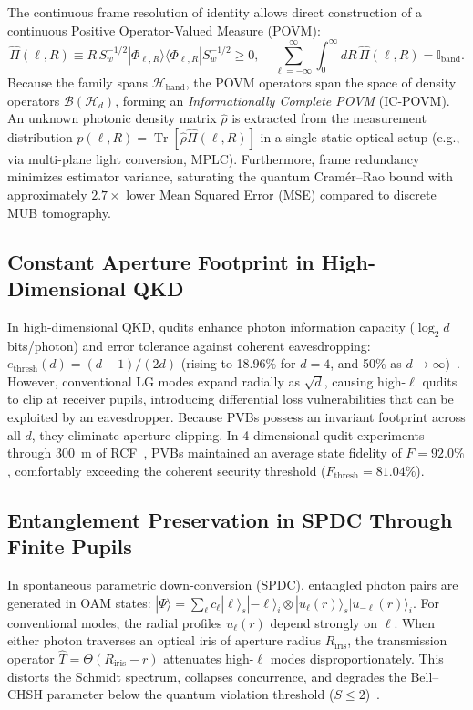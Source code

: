 \documentclass[11pt,a4paper]{article}
\begin{document}
The continuous frame resolution of identity allows direct construction of a continuous Positive Operator-Valued Measure (POVM):
\begin{equation}
\boxed{\hat{\Pi}(\ell, R) \equiv R \, S_w^{-1/2} |\Phi_{\ell, R}\rangle \langle \Phi_{\ell, R}| S_w^{-1/2} \ge 0, \quad \sum_{\ell=-\infty}^\infty \int_0^\infty dR \, \hat{\Pi}(\ell, R) = \mathbb{I}_{\text{band}}.}
\label{eq:povm_def}
\end{equation}
Because the family spans $\mathcal{H}_{\text{band}}$, the POVM operators span the space of density operators $\mathcal{B}(\mathcal{H}_d)$, forming an \emph{Informationally Complete POVM} (IC-POVM). An unknown photonic density matrix $\hat{\rho}$ is extracted from the measurement distribution $p(\ell, R) = \operatorname{Tr}[\hat{\rho} \hat{\Pi}(\ell, R)]$ in a single static optical setup (e.g., via multi-plane light conversion, MPLC). Furthermore, frame redundancy minimizes estimator variance, saturating the quantum Cram{\'e}r--Rao bound with approximately $2.7\times$ lower Mean Squared Error (MSE) compared to discrete MUB tomography.

\subsection{Constant Aperture Footprint in High-Dimensional QKD}

In high-dimensional QKD, qudits enhance photon information capacity ($\log_2 d$ bits/photon) and error tolerance against coherent eavesdropping: $e_{\text{thresh}}(d) = (d-1)/(2d)$ (rising to 18.96\% for $d=4$, and 50\% as $d \to \infty$)~\cite{Cerf2002}. However, conventional LG modes expand radially as $\sqrt{d}$, causing high-$\ell$ qudits to clip at receiver pupils, introducing differential loss vulnerabilities that can be exploited by an eavesdropper. Because PVBs possess an invariant footprint across all $d$, they eliminate aperture clipping. In 4-dimensional qudit experiments through 300~m of RCF~\cite{Villalba2023}, PVBs maintained an average state fidelity of $F = 92.0\%$, comfortably exceeding the coherent security threshold ($F_{\text{thresh}} = 81.04\%$).

\subsection{Entanglement Preservation in SPDC Through Finite Pupils}

In spontaneous parametric down-conversion (SPDC), entangled photon pairs are generated in OAM states: $|\Psi\rangle = \sum_\ell c_\ell |\ell\rangle_s |-\ell\rangle_i \otimes |u_\ell(r)\rangle_s |u_{-\ell}(r)\rangle_i$. For conventional modes, the radial profiles $u_\ell(r)$ depend strongly on $\ell$. When either photon traverses an optical iris of aperture radius $R_{\text{iris}}$, the transmission operator $\hat{T} = \Theta(R_{\text{iris}} - r)$ attenuates high-$\ell$ modes disproportionately. This distorts the Schmidt spectrum, collapses concurrence, and degrades the Bell--CHSH parameter below the quantum violation threshold ($S \le 2$)~\cite{Clauser1969}.
\end{document}
